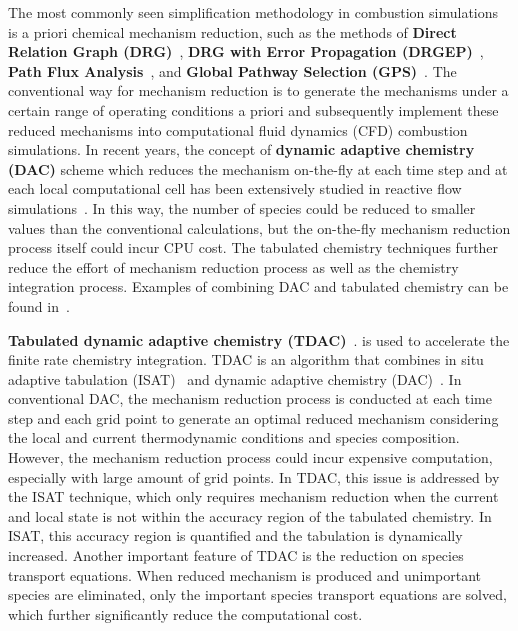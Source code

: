 \documentclass[12pt]{article}
\begin{document}
\begin{itemize}
The most commonly seen simplification methodology in combustion simulations is a priori chemical mechanism reduction, such as the methods of \textbf{Direct Relation Graph (DRG)}~\cite{lu2005directed}, \textbf{DRG with Error Propagation (DRGEP)}~\cite{pepiot2008efficient}, \textbf{Path Flux Analysis}~\cite{sun2010path}, and \textbf{Global Pathway Selection (GPS)}~\cite{gao2016global}. The conventional way for mechanism reduction is to
generate the mechanisms under a certain range of operating conditions a priori and subsequently implement these reduced mechanisms into computational fluid dynamics (CFD) combustion simulations. In recent years, the concept of \textbf{dynamic adaptive chemistry (DAC)} scheme which reduces the mechanism on-the-fly at each time step and at each local
computational cell has been extensively studied in reactive flow simulations~\cite{cymbalist2016application,yang2017parallel}. In this way, the number of species could be reduced to smaller values than the conventional calculations, but the on-the-fly mechanism reduction process
itself could incur CPU cost. The tabulated chemistry techniques further reduce the effort of mechanism reduction process as well as the chemistry integration process. Examples of combining DAC and tabulated chemistry can be
found in~\cite{contino2011coupling,yang2017sensitivity,zhou2018computational}.

\textbf{Tabulated dynamic adaptive chemistry (TDAC)}~\cite{contino2011coupling}. is used to accelerate the finite rate chemistry
integration. TDAC is an algorithm that combines in situ adaptive tabulation (ISAT)~\cite{pope1997computationally} and dynamic adaptive chemistry (DAC)~\cite{liang2009dynamic}. In conventional DAC, the mechanism reduction process is conducted at each time step and each grid point to generate an optimal reduced mechanism considering the local and current thermodynamic conditions and species composition. However, the mechanism reduction process could incur expensive computation, especially with large amount of grid points. In TDAC, this issue is addressed by the ISAT technique, which only requires mechanism reduction when the current and local state is not within the accuracy region of the tabulated chemistry. In ISAT, this accuracy region is quantified and the tabulation is dynamically increased. Another important feature of TDAC is the reduction on species transport equations. When reduced mechanism is produced and unimportant species are eliminated, only the important species transport equations are solved, which further significantly reduce the computational cost.


\end{itemize}
\end{document}
